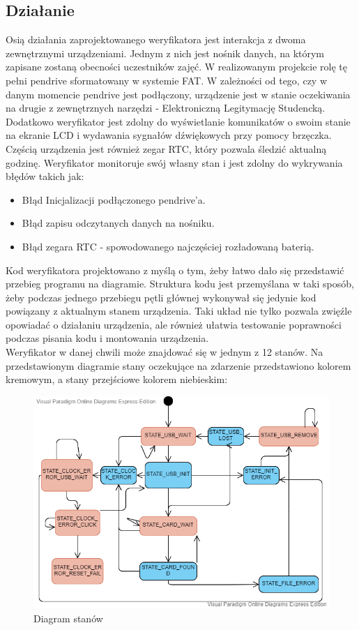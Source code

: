 \documentclass[declaration,shortabstract, mgr]{iithesis}
\begin{document}
\subsection{Działanie}
\indent Osią działania zaprojektowanego weryfikatora jest interakcja z dwoma zewnętrznymi urządzeniami. Jednym z nich jest nośnik danych, na którym zapisane zostaną obecności uczestników zajęć. W realizowanym projekcie rolę tę pełni pendrive sformatowany w systemie FAT. W zależności od tego, czy w danym momencie pendrive jest podłączony, urządzenie jest w stanie oczekiwania na drugie z zewnętrznych narzędzi - Elektroniczną Legitymację Studencką. Dodatkowo weryfikator jest zdolny do wyświetlanie komunikatów o swoim stanie na ekranie LCD i wydawania sygnałów dźwiękowych przy pomocy brzęczka. Częścią urządzenia jest również zegar RTC, który pozwala śledzić aktualną godzinę. Weryfikator monitoruje swój własny stan i jest zdolny do wykrywania błędów takich jak:
\begin{itemize}
\item Błąd Inicjalizacji podłączonego pendrive'a.
\item Błąd zapisu odczytanych danych na nośniku.
\item Błąd zegara RTC - spowodowanego najczęściej rozładowaną baterią.
\end{itemize}

\indent Kod weryfikatora projektowano z myślą o tym, żeby łatwo dało się przedstawić przebieg programu na diagramie. Struktura kodu jest przemyślana w taki sposób, żeby podczas jednego przebiegu pętli głównej wykonywał się jedynie kod powiązany z aktualnym stanem urządzenia. Taki układ nie tylko pozwala zwięźle opowiadać o działaniu urządzenia, ale również ułatwia testowanie poprawności podczas pisania kodu i montowania urządzenia.\\
\indent Weryfikator w danej chwili może znajdować się w jednym z 12 stanów. Na przedstawionym diagramie stany oczekujące na zdarzenie przedstawiono kolorem kremowym, a stany przejściowe kolorem niebieskim:
\begin{figure}[h]
\caption{Diagram stanów}
\centering
\includegraphics[scale=0.6]{state_machine.png}
\end{figure}
\end{document}
